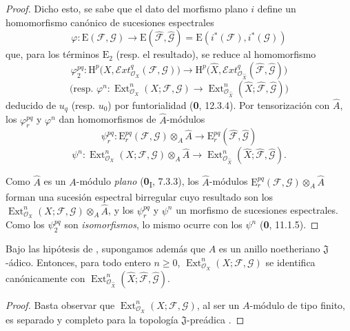 \begin{proof}
Dicho esto, se sabe que el dato del morfismo plano $i$ define un
homomorfismo canónico de sucesiones espectrales
\[
\varphi:\mathrm E(\mathcal F,\mathcal G)\longrightarrow
\mathrm E(\widehat{\mathcal F},\widehat{\mathcal G})
=\mathrm E(i^*(\mathcal F),i^*(\mathcal G))
\]
que, para los términos $\mathrm E_2$ (resp. el resultado), se reduce al
homomorfismo
\[
\varphi_2^{pq}:\mathrm H^p\bigl(X,
\mathcal{E}\!xt^q_{\mathcal O_X}(\mathcal F,\mathcal G)\bigr)
\longrightarrow
\mathrm H^p\bigl(\widehat X,
\mathcal{E}\!xt^q_{\mathcal O_{\widehat X}}
(\widehat{\mathcal F},\widehat{\mathcal G})\bigr)
\]
\[
\text{(resp. }\varphi^n:\operatorname{Ext}^n_{\mathcal O_X}
(X;\mathcal F,\mathcal G)\longrightarrow
\operatorname{Ext}^n_{\mathcal O_{\widehat X}}
(\widehat X;\widehat{\mathcal F},\widehat{\mathcal G})\text{)}
\]
deducido de $u_q$ (resp. $u_0$) por funtorialidad (\textbf{0}, 12.3.4). Por
tensorización con $\widehat A$, los $\varphi_r^{pq}$ y $\varphi^n$ dan
homomorfismos de $\widehat A$-módulos
\[
\psi_r^{pq}:\mathrm E_r^{pq}(\mathcal F,\mathcal G)
\otimes_A\widehat A\longrightarrow
\mathrm E_r^{pq}(\widehat{\mathcal F},\widehat{\mathcal G})
\]
\[
\psi^n:\operatorname{Ext}^n_{\mathcal O_X}(X;\mathcal F,\mathcal G)
\otimes_A\widehat A\longrightarrow
\operatorname{Ext}^n_{\mathcal O_{\widehat X}}
(\widehat X;\widehat{\mathcal F},\widehat{\mathcal G}).
\]

Como $\widehat A$ es un $A$-módulo \emph{plano} (\textbf{0}\textsubscript{I}, 7.3.3), los
$\widehat A$-módulos
$\mathrm E_r^{pq}(\mathcal F,\mathcal G)\otimes_A\widehat A$ forman una
sucesión espectral birregular cuyo resultado son los
$\operatorname{Ext}^n_{\mathcal O_X}(X;\mathcal F,\mathcal G)\otimes_A\widehat A$, y los
$\psi_r^{pq}$ y $\psi^n$ un morfismo de sucesiones espectrales. Como los
$\psi_2^{pq}$ son \emph{isomorfismos}, lo mismo ocurre con los $\psi^n$
(\textbf{0}, 11.1.5).
\end{proof}

\begin{corollary}[4.5.2]
\label{III.4.5.2}
\label{III.4.5.2-fr}
Bajo las hipótesis de , supongamos además que $A$ es
un anillo noetheriano $\mathfrak J$-ádico. Entonces, para todo entero
$n\geq0$, $\operatorname{Ext}^n_{\mathcal O_X}(X;\mathcal F,\mathcal G)$
se identifica canónicamente con
$\operatorname{Ext}^n_{\mathcal O_{\widehat X}}
(\widehat X;\widehat{\mathcal F},\widehat{\mathcal G})$.
\end{corollary}

\begin{proof}
Basta observar que $\operatorname{Ext}^n_{\mathcal O_X}
(X;\mathcal F,\mathcal G)$, al ser un $A$-módulo de tipo finito, es separado y
completo para la topología $\mathfrak J$-preádica .
\end{proof}

